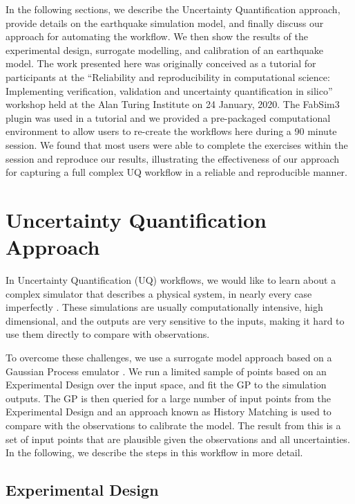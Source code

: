 \documentclass[openacc]{rstransa}%
\begin{document}
In the following sections, we describe the Uncertainty Quantification approach, provide details
on the earthquake simulation model, and finally discuss our approach for automating the workflow.
We then show the results of the experimental design, surrogate modelling, and calibration
of an earthquake model. The work presented here was originally conceived as a tutorial for participants at the
``Reliability and reproducibility in computational science: Implementing verification, validation and uncertainty quantification in silico'' workshop held at the Alan Turing Institute on 24 January, 2020.
The FabSim3 plugin was used in a tutorial and we provided a pre-packaged computational environment
to allow users to re-create the workflows here during a 90 minute session. We found that most
users were able to complete the exercises within the session and reproduce our results,
illustrating the effectiveness of our approach for capturing a full complex UQ workflow
in a reliable and reproducible manner.

\section{Uncertainty Quantification Approach}

In Uncertainty Quantification (UQ) workflows, we would like to learn about a complex simulator that describes
a physical system, in nearly every case imperfectly \cite{experimentaldesign,calibration}.
These simulations are usually computationally intensive,
high dimensional, and the outputs are very sensitive to the inputs, making it hard to use them directly
to compare with observations.

To overcome these challenges, we use a surrogate model approach based on a Gaussian Process emulator \cite{gprw}.
We run a limited sample of points based on an Experimental Design over the input space, and fit the GP
to the simulation outputs. The GP is then queried for a large number of input points from the Experimental
Design and an approach known as History Matching is used to compare with the observations
to calibrate the model. The result from this is a set of input points that are plausible given the
observations and all uncertainties. In the following, we describe the steps in this workflow in more detail.

\subsection{Experimental Design}
\end{document}
